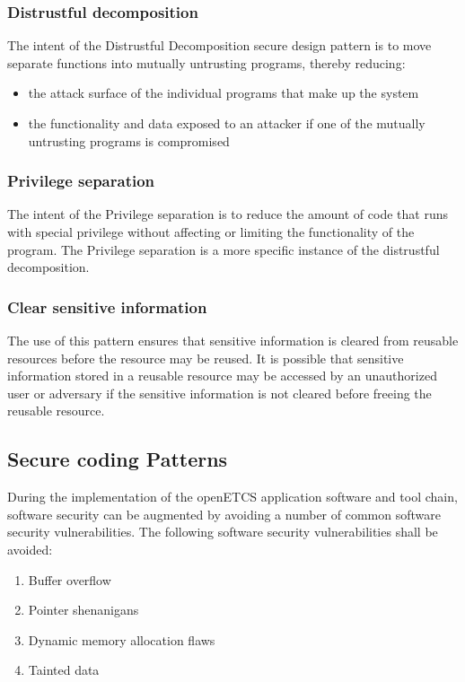 \documentclass{template/openetcs_report}
\begin{document}
\subsubsection{Distrustful decomposition}
The intent of the Distrustful Decomposition secure design pattern is to move separate functions into mutually untrusting programs, thereby reducing:
\begin{itemize}
  \item the attack surface of the individual programs that make up the system
  \item the functionality and data exposed to an attacker if one of the mutually untrusting programs is compromised
\end{itemize}

\subsubsection{Privilege separation}
The intent of the Privilege separation is to reduce the amount of code that runs with special privilege without affecting or limiting the functionality of the program. The Privilege separation is a more specific instance of the distrustful decomposition.

\subsubsection{Clear sensitive information}
The use of this pattern ensures that sensitive information is cleared from reusable resources before the resource may be reused. It is possible that sensitive information stored in a reusable resource may be accessed by an unauthorized user or adversary if the sensitive information is not cleared before freeing the reusable resource.


\subsection{Secure coding Patterns}
\label{CPatterns}
During the implementation of the openETCS application software and tool chain, software security can be augmented by avoiding a number of common software security vulnerabilities. 
The following software security vulnerabilities shall be avoided:
\begin{enumerate}
  \item Buffer overflow
  \item Pointer shenanigans
  \item Dynamic memory allocation flaws
  \item Tainted data
\end{enumerate}
\end{document}

